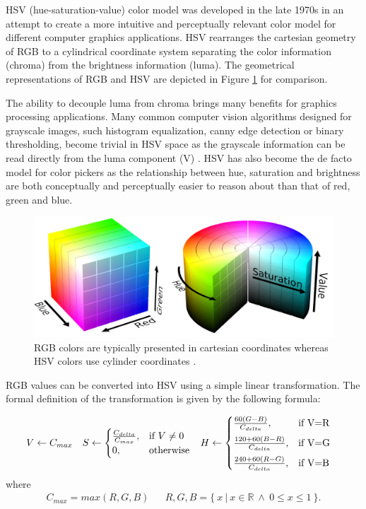 \documentclass[thesis.tex]{subfiles}
\begin{document}
HSV (hue-saturation-value) color model was developed in the late 1970s in an attempt to create a more intuitive and perceptually relevant color model for different computer graphics applications. HSV rearranges the cartesian geometry of RGB to a cylindrical coordinate system separating the color information (chroma) from the brightness information (luma). The geometrical representations of RGB and HSV are depicted in Figure \ref{figure:rgb_hsv} for comparison.

The ability to decouple luma from chroma brings many benefits for graphics processing applications. Many common computer vision algorithms designed for grayscale images, such histogram equalization, canny edge detection or binary thresholding, become trivial in HSV space as the grayscale information can be read directly from the luma component (V) \cite{color_segmentation}. HSV has also become the de facto model for color pickers as the relationship between hue, saturation and brightness are both conceptually and perceptually easier to reason about than that of red, green and blue.

\begin{figure}[ht]
\centering \includegraphics[width=\textwidth]{images/rgb_hsv}
\caption{RGB colors are typically presented in cartesian coordinates whereas HSV colors use cylinder coordinates \cite{hsv_cylinder}\cite{rgb_cube}.\label{figure:rgb_hsv}}
\end{figure}

RGB values can be converted into HSV using a simple linear transformation. The formal definition of the transformation is given by the following formula:

\begin{align}
V &\leftarrow C_{max}	&
S &\leftarrow
	\begin{cases}
		\frac{C_{delta}}{C_{max}}, & \text{if $V\neq0$}\\
		0, & \text{otherwise}
	\end{cases}			&
H &\leftarrow
	\begin{cases}
		\frac{60(G-B)}{C_{delta}}, & \text{if V=R}\vspace{2mm}\\
		\frac{120+60(B-R)}{C_{delta}}, & \text{if V=G}\vspace{2mm}\\
		\frac{240+60(R-G)}{C_{delta}}, & \text{if V=B}
	\end{cases}
\end{align}
\noindent where
\begin{align*}
C_{max}=max(R, G, B)	&			&
R, G, B = \{\ x\ \vert\ x \in \mathbb R\ \wedge\ 0 \leq x \leq 1\ \}.
\end{align*}
\end{document}
